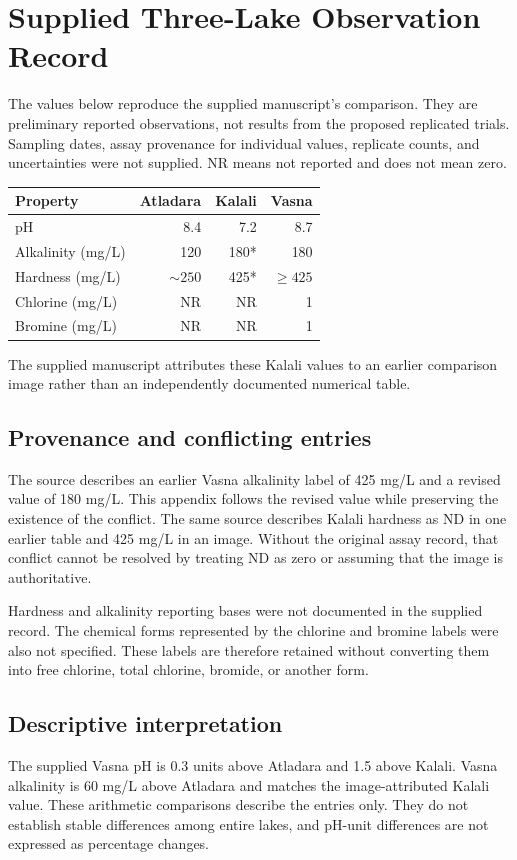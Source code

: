 \documentclass[12pt,a4paper]{article}
\newcommand{\papersection}[1]{\clearpage\section{#1}}
\begin{document}
\papersection{Supplied Three-Lake Observation Record}
The values below reproduce the supplied manuscript's comparison. They are preliminary reported observations, not results from the proposed replicated trials. Sampling dates, assay provenance for individual values, replicate counts, and uncertainties were not supplied. NR means not reported and does not mean zero.

\begin{center}\small
\begin{tabularx}{\linewidth}{@{}Yrrr@{}}
\toprule Property & Atladara & Kalali & Vasna\\\midrule
pH & 8.4 & 7.2 & 8.7\\
Alkalinity (mg/L) & 120 & 180* & 180\\
Hardness (mg/L) & $\sim250$ & 425* & $\geq425$\\
Chlorine (mg/L) & NR & NR & 1\\
Bromine (mg/L) & NR & NR & 1\\\bottomrule
\end{tabularx}\end{center}
{\small *The supplied manuscript attributes these Kalali values to an earlier comparison image rather than an independently documented numerical table.}

\subsection{Provenance and conflicting entries}
The source describes an earlier Vasna alkalinity label of 425 mg/L and a revised value of 180 mg/L. This appendix follows the revised value while preserving the existence of the conflict. The same source describes Kalali hardness as ND in one earlier table and 425 mg/L in an image. Without the original assay record, that conflict cannot be resolved by treating ND as zero or assuming that the image is authoritative.

Hardness and alkalinity reporting bases were not documented in the supplied record. The chemical forms represented by the chlorine and bromine labels were also not specified. These labels are therefore retained without converting them into free chlorine, total chlorine, bromide, or another form.

\subsection{Descriptive interpretation}
The supplied Vasna pH is 0.3 units above Atladara and 1.5 above Kalali. Vasna alkalinity is 60 mg/L above Atladara and matches the image-attributed Kalali value. These arithmetic comparisons describe the entries only. They do not establish stable differences among entire lakes, and pH-unit differences are not expressed as percentage changes.
\end{document}
